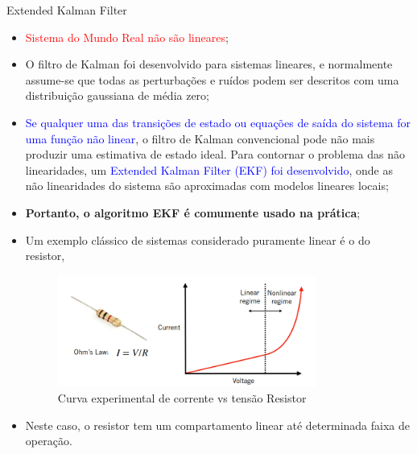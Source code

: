 Extended Kalman Filter
\begin{itemize}
    \item \textcolor{red}{Sistema do Mundo Real não são lineares};
    \item O filtro de Kalman foi desenvolvido para sistemas lineares, e normalmente assume-se que todas as perturbações e ruídos podem ser descritos com uma distribuição gaussiana de média zero;
    \item \textcolor{blue}{Se qualquer uma das transições de estado ou equações de saída do sistema for uma função não linear}, o filtro de Kalman convencional pode não mais produzir uma estimativa de estado ideal. Para contornar o problema das não linearidades, um \textcolor{blue}{Extended Kalman Filter (EKF) foi desenvolvido}, onde as não linearidades do sistema são aproximadas com modelos lineares locais;
    \item \textbf{Portanto, o algoritmo EKF é comumente usado na prática};
\end{itemize}



\begin{itemize}
    \item Um exemplo clássico de sistemas considerado puramente linear é o do resistor,


\begin{figure}
    \centering
    \includegraphics[width=0.8\textwidth]{chapters/chapter3/figures/resistor_curve.png}
    \caption{Curva experimental de corrente vs tensão Resistor}
\end{figure}

    \item Neste caso, o resistor tem um compartamento linear até determinada faixa de operação.
\end{itemize}



